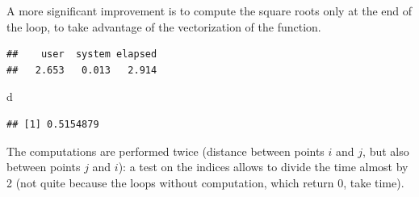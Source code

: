 \documentclass[
  12pt,
  american,
  a4paper,
  extrafontsizes,onecolumn,openright
  ]{memoir}
\newenvironment{Shaded}{\begin{snugshade}}{\end{snugshade}}
\newcommand{\ControlFlowTok}[1]{\textcolor[rgb]{0.13,0.29,0.53}{\textbf{#1}}}
\newcommand{\DecValTok}[1]{\textcolor[rgb]{0.00,0.00,0.81}{#1}}
\newcommand{\FunctionTok}[1]{\textcolor[rgb]{0.13,0.29,0.53}{\textbf{#1}}}
\newcommand{\NormalTok}[1]{#1}
\newcommand{\OtherTok}[1]{\textcolor[rgb]{0.56,0.35,0.01}{#1}}
\newcommand{\SpecialCharTok}[1]{\textcolor[rgb]{0.81,0.36,0.00}{\textbf{#1}}}
\newlength{\rf}
\begin{document}
A more significant improvement is to compute the square roots only at the end of the loop, to take advantage of the vectorization of the function.

\scriptsize

\begin{Shaded}
\end{Shaded}

\begin{verbatim}
##    user  system elapsed 
##   2.653   0.013   2.914
\end{verbatim}

\begin{Shaded}
\begin{Highlighting}[]
\NormalTok{d}
\end{Highlighting}
\end{Shaded}

\begin{verbatim}
## [1] 0.5154879
\end{verbatim}

\normalsize

The computations are performed twice (distance between points \(i\) and \(j\), but also between points \(j\) and \(i\)): a test on the indices allows to divide the time almost by 2 (not quite because the loops without computation, which return \(0\), take time).
\end{document}
